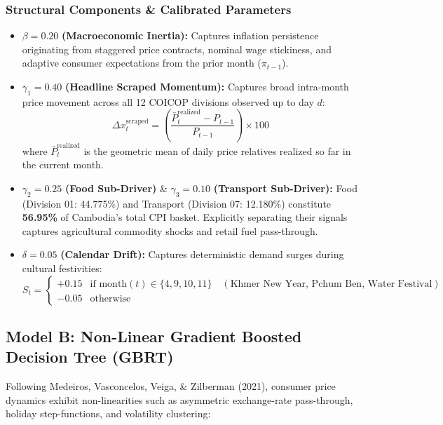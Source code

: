 \documentclass[11pt,a4paper]{article}
\begin{document}
\subsubsection*{Structural Components \& Calibrated Parameters}
\begin{itemize}
    \item $\beta = 0.20$ \textbf{(Macroeconomic Inertia):} Captures inflation persistence originating from staggered price contracts, nominal wage stickiness, and adaptive consumer expectations from the prior month ($\pi_{t-1}$).
    \item $\gamma_1 = 0.40$ \textbf{(Headline Scraped Momentum):} Captures broad intra-month price movement across all 12 COICOP divisions observed up to day $d$:
    \begin{equation}
        \Delta x_t^{\text{scraped}} = \left( \frac{\bar{P}_t^{\text{realized}} - P_{t-1}}{P_{t-1}} \right) \times 100
    \end{equation}
    where $\bar{P}_t^{\text{realized}}$ is the geometric mean of daily price relatives realized so far in the current month.
    \item $\gamma_2 = 0.25$ \textbf{(Food Sub-Driver)} \& $\gamma_3 = 0.10$ \textbf{(Transport Sub-Driver):} Food (Division 01: 44.775\%) and Transport (Division 07: 12.180\%) constitute \textbf{56.95\%} of Cambodia's total CPI basket. Explicitly separating their signals captures agricultural commodity shocks and retail fuel pass-through.
    \item $\delta = 0.05$ \textbf{(Calendar Drift):} Captures deterministic demand surges during cultural festivities:
    \begin{equation}
        S_t = \begin{cases}
            +0.15 & \text{if } \text{month}(t) \in \{4, 9, 10, 11\} \quad (\text{Khmer New Year, Pchum Ben, Water Festival}) \\
            -0.05 & \text{otherwise}
        \end{cases}
    \end{equation}
\end{itemize}

\subsection{Model B: Non-Linear Gradient Boosted Decision Tree (GBRT)}

Following Medeiros, Vasconcelos, Veiga, \& Zilberman (2021), consumer price dynamics exhibit non-linearities such as asymmetric exchange-rate pass-through, holiday step-functions, and volatility clustering:
\end{document}
